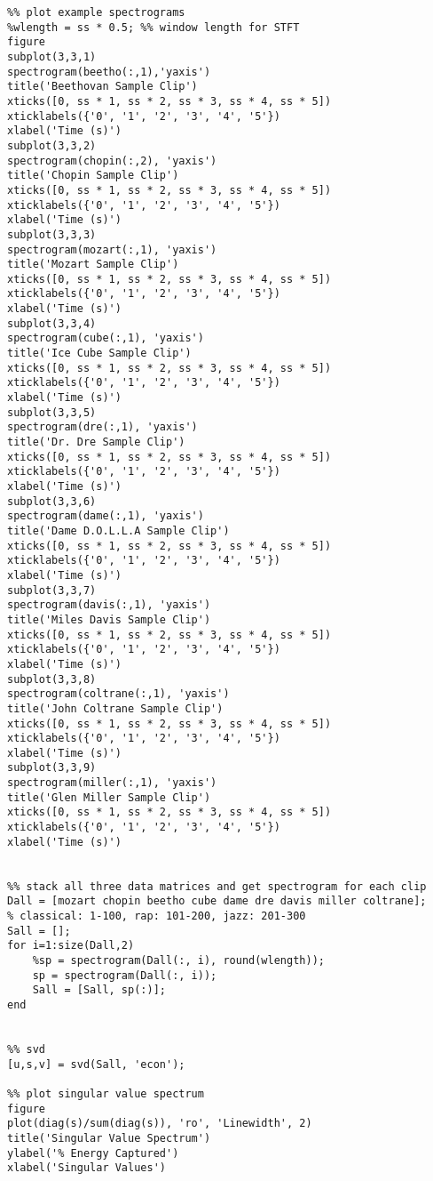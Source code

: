 \documentclass[12pt, a4paper]{article}
\begin{document}
\begin{verbatim}
%% plot example spectrograms
%wlength = ss * 0.5; %% window length for STFT
figure
subplot(3,3,1)
spectrogram(beetho(:,1),'yaxis')
title('Beethovan Sample Clip')
xticks([0, ss * 1, ss * 2, ss * 3, ss * 4, ss * 5])
xticklabels({'0', '1', '2', '3', '4', '5'})
xlabel('Time (s)')
subplot(3,3,2)
spectrogram(chopin(:,2), 'yaxis')
title('Chopin Sample Clip')
xticks([0, ss * 1, ss * 2, ss * 3, ss * 4, ss * 5])
xticklabels({'0', '1', '2', '3', '4', '5'})
xlabel('Time (s)')
subplot(3,3,3)
spectrogram(mozart(:,1), 'yaxis')
title('Mozart Sample Clip')
xticks([0, ss * 1, ss * 2, ss * 3, ss * 4, ss * 5])
xticklabels({'0', '1', '2', '3', '4', '5'})
xlabel('Time (s)')
subplot(3,3,4)
spectrogram(cube(:,1), 'yaxis')
title('Ice Cube Sample Clip')
xticks([0, ss * 1, ss * 2, ss * 3, ss * 4, ss * 5])
xticklabels({'0', '1', '2', '3', '4', '5'})
xlabel('Time (s)')
subplot(3,3,5)
spectrogram(dre(:,1), 'yaxis')
title('Dr. Dre Sample Clip')
xticks([0, ss * 1, ss * 2, ss * 3, ss * 4, ss * 5])
xticklabels({'0', '1', '2', '3', '4', '5'})
xlabel('Time (s)')
subplot(3,3,6)
spectrogram(dame(:,1), 'yaxis')
title('Dame D.O.L.L.A Sample Clip')
xticks([0, ss * 1, ss * 2, ss * 3, ss * 4, ss * 5])
xticklabels({'0', '1', '2', '3', '4', '5'})
xlabel('Time (s)')
subplot(3,3,7)
spectrogram(davis(:,1), 'yaxis')
title('Miles Davis Sample Clip')
xticks([0, ss * 1, ss * 2, ss * 3, ss * 4, ss * 5])
xticklabels({'0', '1', '2', '3', '4', '5'})
xlabel('Time (s)')
subplot(3,3,8)
spectrogram(coltrane(:,1), 'yaxis')
title('John Coltrane Sample Clip')
xticks([0, ss * 1, ss * 2, ss * 3, ss * 4, ss * 5])
xticklabels({'0', '1', '2', '3', '4', '5'})
xlabel('Time (s)')
subplot(3,3,9)
spectrogram(miller(:,1), 'yaxis')
title('Glen Miller Sample Clip')
xticks([0, ss * 1, ss * 2, ss * 3, ss * 4, ss * 5])
xticklabels({'0', '1', '2', '3', '4', '5'})
xlabel('Time (s)')


%% stack all three data matrices and get spectrogram for each clip
Dall = [mozart chopin beetho cube dame dre davis miller coltrane];
% classical: 1-100, rap: 101-200, jazz: 201-300
Sall = [];
for i=1:size(Dall,2)
    %sp = spectrogram(Dall(:, i), round(wlength));
    sp = spectrogram(Dall(:, i));
    Sall = [Sall, sp(:)];
end


%% svd
[u,s,v] = svd(Sall, 'econ');

%% plot singular value spectrum
figure
plot(diag(s)/sum(diag(s)), 'ro', 'Linewidth', 2)
title('Singular Value Spectrum')
ylabel('% Energy Captured')
xlabel('Singular Values')


\end{verbatim}
\end{document}
